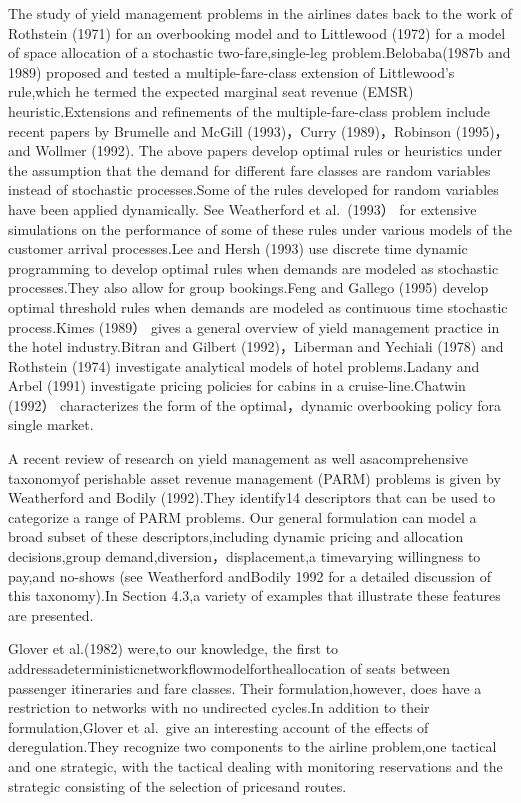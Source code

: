The study of yield management problems in the airlines dates back to the
work of Rothstein (1971) for an overbooking model and to Littlewood
(1972) for a model of space allocation of a stochastic
two-fare,single-leg problem.Belobaba(1987b and 1989) proposed and tested
a multiple-fare-class extension of Littlewood's rule,which he termed the
expected marginal seat revenue (EMSR) heuristic.Extensions and
refinements of the multiple-fare-class problem include recent papers by
Brumelle and McGill (1993)，Curry (1989)，Robinson (1995)，and Wollmer
(1992). The above papers develop optimal rules or heuristics under the
assumption that the demand for different fare classes are random
variables instead of stochastic processes.Some of the rules developed
for random variables have been applied dynamically. See Weatherford et
al.~(1993） for extensive simulations on the performance of some of
these rules under various models of the customer arrival processes.Lee
and Hersh (1993) use discrete time dynamic programming to develop
optimal rules when demands are modeled as stochastic processes.They also
allow for group bookings.Feng and Gallego (1995) develop optimal
threshold rules when demands are modeled as continuous time stochastic
process.Kimes (1989） gives a general overview of yield management
practice in the hotel industry.Bitran and Gilbert (1992)，Liberman and
Yechiali (1978) and Rothstein (1974) investigate analytical models of
hotel problems.Ladany and Arbel (1991) investigate pricing policies for
cabins in a cruise-line.Chatwin (1992） characterizes the form of the
optimal，dynamic overbooking policy fora single market.

A recent review of research on yield management as well asacomprehensive
taxonomyof perishable asset revenue management (PARM) problems is given
by Weatherford and Bodily (1992).They identify14 descriptors that can be
used to categorize a range of PARM problems. Our general formulation can
model a broad subset of these descriptors,including dynamic pricing and
allocation decisions,group demand,diversion，displacement,a timevarying
willingness to pay,and no-shows (see Weatherford andBodily 1992 for a
detailed discussion of this taxonomy).In Section 4.3,a variety of
examples that illustrate these features are presented.

Glover et al.(1982) were,to our knowledge, the first to
addressadeterministicnetworkflowmodelfortheallocation of seats between
passenger itineraries and fare classes. Their formulation,however, does
have a restriction to networks with no undirected cycles.In addition to
their formulation,Glover et al.~give an interesting account of the
effects of deregulation.They recognize two components to the airline
problem,one tactical and one strategic, with the tactical dealing with
monitoring reservations and the strategic consisting of the selection of
pricesand routes.

